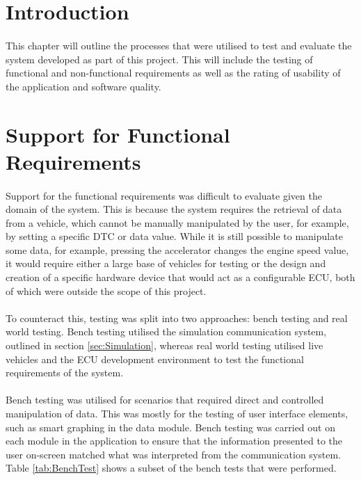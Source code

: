 \section{Introduction}
	\paragraph{}{
	This chapter will outline the processes that were utilised to test and evaluate the system developed as part of this project. This will include the testing of functional and non-functional requirements as well as the rating of usability of the application and software quality.
	}
	
\section{Support for Functional Requirements}
	\paragraph{}{
	Support for the functional requirements was difficult to evaluate given the domain of the system. This is because the system requires the retrieval of data from a vehicle, which cannot be manually manipulated by the user, for example, by setting a specific DTC or data value. While it is still possible to manipulate some data, for example, pressing the accelerator changes the engine speed value, it would require either a large base of vehicles for testing or the design and creation of a specific hardware device that would act as a configurable ECU, both of which were outside the scope of this project.
	}

	\paragraph{}{
	To counteract this, testing was split into two approaches: bench testing and real world testing. Bench testing utilised the simulation communication system, outlined in section \ref{sec:Simulation}, whereas real world testing utilised live vehicles and the ECU development environment to test the functional requirements of the system. 
	}
	
	\paragraph{}{
	Bench testing was utilised for scenarios that required direct and controlled manipulation of data. This was mostly for the testing of user interface elements, such as smart graphing in the data module. Bench testing was carried out on each module in the application to ensure that the information presented to the user on-screen matched what was interpreted from the communication system. Table \ref{tab:BenchTest} shows a subset of the bench tests that were performed.
	
	
	}
	
